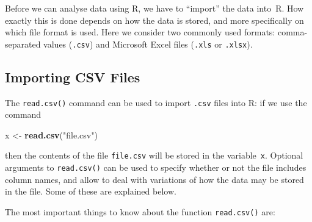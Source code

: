 \documentclass[
  a4paper,
]{article}
\newenvironment{Shaded}{\begin{snugshade}}{\end{snugshade}}
\newcommand{\FunctionTok}[1]{\textcolor[rgb]{0.13,0.29,0.53}{\textbf{#1}}}
\newcommand{\NormalTok}[1]{#1}
\newcommand{\OtherTok}[1]{\textcolor[rgb]{0.56,0.35,0.01}{#1}}
\newcommand{\StringTok}[1]{\textcolor[rgb]{0.31,0.60,0.02}{#1}}
\theoremstyle{definition}
\theoremstyle{definition}
\theoremstyle{definition}
\theoremstyle{definition}
\theoremstyle{remark}
\begin{document}
Before we can analyse data using R, we have to ``import'' the data
into~R. How exactly this is done depends on how the data is stored,
and more specifically on which file format is used. Here we consider
two commonly used formats: comma-separated values (\texttt{.csv})
and Microsoft Excel files (\texttt{.xls} or \texttt{.xlsx}).

\subsection*{Importing CSV Files}\label{importing-csv-files}

The \texttt{read.csv()} command can be used to import \texttt{.csv} files
into R: if we use the command

\begin{Shaded}
\begin{Highlighting}[]
\NormalTok{  x }\OtherTok{\textless{}{-}} \FunctionTok{read.csv}\NormalTok{(}\StringTok{"file.csv"}\NormalTok{)}
\end{Highlighting}
\end{Shaded}

then the contents of the file \texttt{file.csv} will be stored in the variable~\texttt{x}.
Optional arguments to \texttt{read.csv()} can be used to specify whether or not the
file includes column names, and allow to deal with variations of how the data
may be stored in the file. Some of these are explained below.

The most important things to
know about the function \texttt{read.csv()} are:
\end{document}
